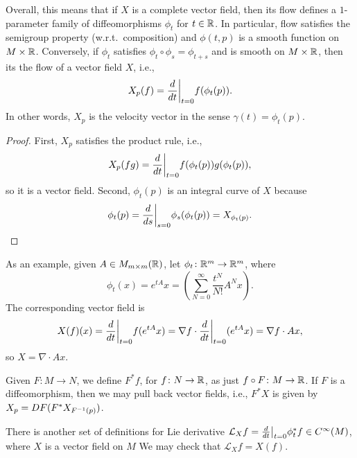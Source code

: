 Overall, this means that if $X$ is a complete vector field, then its flow defines a $1$-parameter family of diffeomorphisms $\phi_t$ for $t \in \mathbb R$. In particular, flow satisfies the semigroup property (w.r.t.\ composition) and $\phi(t, p)$ is a smooth function on $M \times \mathbb R$. Conversely, if $\phi_t$ satisfies $\phi_t \circ \phi_s = \phi_{t + s}$ and is smooth on $M \times \mathbb R$, then its the flow of a vector field $X$, i.e.,
\[ X_p (f) = \restr{\frac{d}{dt}}{t=0} f(\phi_t(p)). \]
In other words, $X_p$ is the velocity vector in the sense $\gamma(t) = \phi_t(p)$.
\begin{proof}
    First, $X_p$ satisfies the product rule, i.e.,
    \[ X_p(fg) = \restr{\frac{d}{dt}}{t=0} f(\phi_t(p)) g(\phi_t(p)), \]
    so it is a vector field. Second, $\phi_t(p)$ is an integral curve of $X$ because
    \[ \phi_t(p) = \restr{\frac{d}{ds}}{s=0} \phi_s(\phi_t(p)) = X_{\phi_t(p)}. \qedhere \]
\end{proof}
As an example, given $A \in M_{m \times m}(\mathbb R)$, let $\phi_t \colon \mathbb R^m \to \mathbb R^m$, where
\[ \phi_t(x) = e^{tA} x = \left(\sum_{N=0}^\infty \frac{t^N}{N!} A^N x\right). \]
The corresponding vector field is
\[ X(f)(x) = \restr{\frac{d}{dt}}{t=0} f(e^{tA} x) = \nabla f \cdot \restr{\frac{d}{dt}}{t=0}(e^{tA}x) = \nabla f \cdot A x, \]
so $X = \nabla \cdot Ax$.
\begin{definition}[Pullback]
    Given $F \colon M \to N$, we define $F^\ast f$, for $f \colon N \to \mathbb R$, as just $f \circ F \colon M \to \mathbb R$. If $F$ is a diffeomorphism, then we may pull back vector fields, i.e., $F^\ast X$ is given by $X_p = DF(F^\ast X_{F^{-1}(p)})$.
\end{definition}
There is another set of definitions for Lie derivative $\mathcal{L}_X f = \restr{\frac{d}{dt}}{t=0} \phi_t^\ast f \in C^\infty(M)$, where $X$ is a vector field on $M$ We may check that $\mathcal{L}_X f = X(f)$.